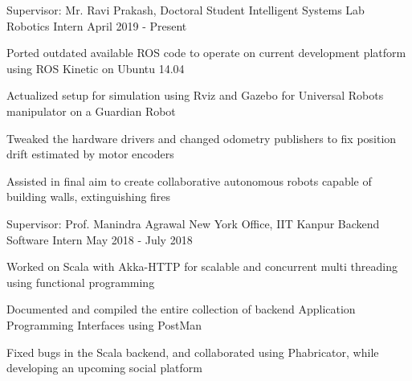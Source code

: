 \begin{cventries}

  \cventry
    {Supervisor: Mr. Ravi Prakash, Doctoral Student}
    {Intelligent Systems Lab}
    {Robotics Intern}
    {April 2019 - Present}
    {
      \begin{cvitems}
        \item{Ported outdated available ROS code to operate on current development platform using ROS Kinetic on Ubuntu 14.04}
        \item{Actualized setup for simulation using Rviz and Gazebo for Universal Robots manipulator on a Guardian Robot}
        \item{Tweaked the hardware drivers and changed odometry publishers to fix position drift estimated by motor encoders}
        \item{Assisted in final aim to create collaborative autonomous robots capable of building walls, extinguishing fires}
      \end{cvitems}
    }  

  \cventry
    {Supervisor: Prof. Manindra Agrawal}
    {New York Office, IIT Kanpur}
    {Backend Software Intern}
    {May 2018 - July 2018}
    {
      \begin{cvitems}
        \item{Worked on Scala with Akka-HTTP for scalable and concurrent multi threading using functional programming}
        \item{Documented and compiled the entire collection of backend Application Programming Interfaces using PostMan}
        \item{Fixed bugs in the Scala backend, and collaborated using Phabricator, while developing an upcoming social platform}
      \end{cvitems}
    }

\end{cventries}

